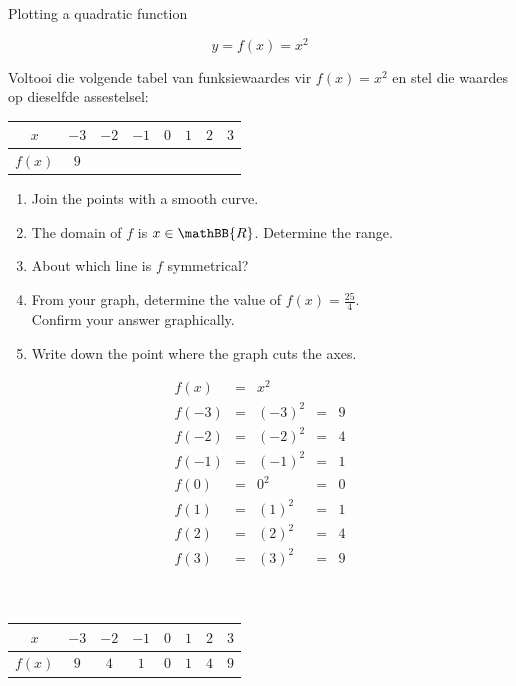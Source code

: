 \begin{wex}{Plotting a quadratic function}
{
\begin{equation*}
 y = f(x) = x^{2}
\end{equation*}

Voltooi die volgende tabel van funksiewaardes vir $f(x)=x^{2}$ en stel die waardes op dieselfde assestelsel:
\\
\begin{center}
\begin{tabular}{|c|c|c|c|c|c|c|c|}
\hline
  $x$ &  $-3$ & $-2$ & $-1$ & $0$ & $1$ & $2$ & $3$
\\ \hline
 $f(x)$& $9$ &&&&&&
\\ \hline
\end{tabular}
\end{center}
\vspace{10pt}
\begin{enumerate}[noitemsep, label=\textbf{\arabic*}. ] 
 \item Join the points with a smooth curve.
\item The domain of $f$ is $x \in \mathBB{R}$. Determine the range.
\item About which line is $f$ symmetrical?
\item From your graph, determine the value of $f(x) = \frac{25}{4}$. \\Confirm your answer graphically.
\item Write down the point where the graph cuts the axes.
\end{enumerate}
}
{
\begin{equation*}
 \begin{array}{cclcc}
  f(x) &=& x^{2} & &\\
 f(-3) &=& (-3)^{2} &=& 9 \\ 
 f(-2) &=& (-2)^{2} &=& 4 \\
 f(-1) &=& (-1)^{2} &=& 1 \\
f(0) &=& 0^{2} &= &0 \\
f(1) &=& (1)^{2} &= &1 \\ 
f(2) &=& (2)^{2} &= &4 \\
f(3) &=& (3)^{2} &= &9
 \end{array}
\end{equation*}
\\
\\
\begin{center}
\begin{tabular}{|c|c|c|c|c|c|c|c|}
\hline
  $x$ &  $-3$ & $-2$ & $-1$ & $0$ & $1$ & $2$ & $3$
\\ \hline
 $f(x)$& $9$ &$4$&$1$&$0$&$1$&$4$&$9$
\\ \hline
\end{tabular}
\end{center}

}
\end{wex}
